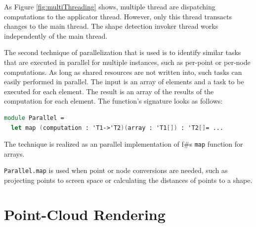As Figure \ref{fig:multiThreading} shows, multiple thread are dispatching computations to the applicator thread. However, only this thread transacts changes to the main thread. The shape detection invoker thread works independently of the main thread. 


The second technique of parallelization that is used is to identify similar tasks that are executed in parallel for multiple instances, such as per-point or per-node computations. As long as shared resources are not written into, such tasks can easily performed in parallel. The input is an array of elements and a task to be executed for each element. The result is an array of the results of the computation for each element. The function's signature looks as follows: 
\\
\begin{lstlisting}[language = FSharp]
module Parallel = 
  let map (computation : 'T1->'T2)(array : 'T1[]) : 'T2[]= ...
\end{lstlisting}
The technique is realized as an parallel implementation of f\#s \verb|map| function for arrays. 

\verb|Parallel.map| is used when point or node conversions are needed, such as projecting points to screen space or calculating the distances of points to a shape. 


\section{Point-Cloud Rendering}
\label{sec:rendering}

